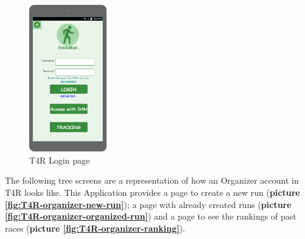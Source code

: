 \begin{figure}[H]
  \centering
  \includegraphics[width=0.30\textwidth]{pictures/mockup/T4R-login.png}
  \caption{T4R Login page}
  \label{fig:T4R-login}
\end{figure}

The following tree screens are a representation of how an Organizer account in T4R looks like. This Application provides a page to create a new run (\textbf{picture \ref{fig:T4R-organizer-new-run}}); a page with already created runs (\textbf{picture \ref{fig:T4R-organizer-organized-run}}) and a page to see the rankings of past races (\textbf{picture \ref{fig:T4R-organizer-ranking}}).


